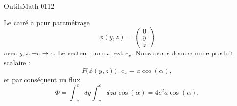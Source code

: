 
\begin{corrige}{OutilsMath-0112}

    Le carré a pour paramétrage
    \begin{equation}
        \phi(y,z)=\begin{pmatrix}
            0    \\ 
            y    \\ 
            z    
        \end{pmatrix}
    \end{equation}
    avec $y,z\colon -c\to c$. Le vecteur normal est $e_x$. Nous avons donc comme produit scalaire :
    \begin{equation}
        F\big( \phi(y,z) \big)\cdot e_x=a\cos(\alpha),
    \end{equation}
    et par conséquent un flux
    \begin{equation}
        \Phi=\int_{-c}^cdy\int_{-c}^c dza\cos(\alpha)=4c^2a\cos(\alpha).
    \end{equation}

\end{corrige}
